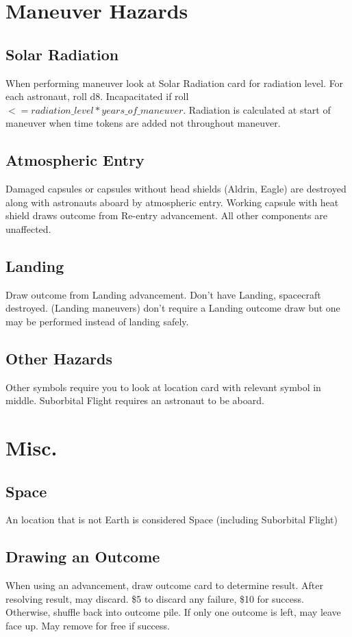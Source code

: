 \documentclass[12pt]{article}
\begin{document}
\begin{multicols*}{2}
\section*{Maneuver Hazards}
\subsection*{Solar Radiation}
When performing maneuver look at Solar Radiation card for radiation level. For each astronaut, roll d8. Incapacitated if roll $<= radiation\_level * years\_of\_maneuver$. Radiation is calculated at start of maneuver when time tokens are added not throughout maneuver.

\subsection*{Atmospheric Entry}
Damaged capsules or capsules without head shields (Aldrin, Eagle) are destroyed along with astronauts aboard by atmospheric entry. Working capsule with heat shield draws outcome from Re-entry advancement. All other components are unaffected.

\subsection*{Landing}
Draw outcome from Landing advancement. Don't have Landing, spacecraft destroyed. (Landing maneuvers) don't require a Landing outcome draw but one may be performed instead of landing safely.

\subsection*{Other Hazards}
Other symbols require you to look at location card with relevant symbol in middle. Suborbital Flight requires an astronaut to be aboard.

\section*{Misc.}
\subsection*{Space}
    An location that is not Earth is considered Space (including Suborbital Flight)

\subsection*{Drawing an Outcome}
When using an advancement, draw outcome card to determine result. After resolving result, may discard. \$5 to discard any failure, \$10 for success. Otherwise, shuffle back into outcome pile. If only one outcome is left, may leave face up. May remove for free if success.


\end{multicols*}
\end{document}
